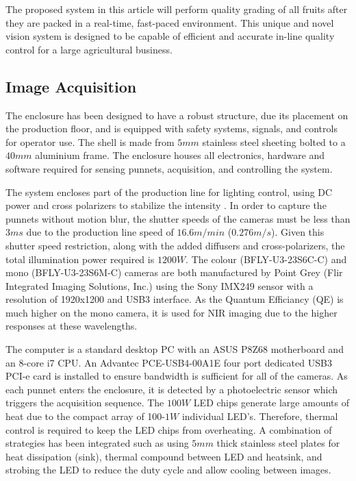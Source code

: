 \documentclass[fleqn,twoside]{article}
\begin{document}
The proposed system in this article will perform quality grading of all fruits after they are packed in a real-time, fast-paced environment. This unique and novel vision system is designed to be capable of efficient and accurate in-line quality control for a large agricultural business.   



\subsection{Image Acquisition}

The enclosure has been designed to have a robust structure, due its placement on the production floor, and is equipped with safety systems, signals, and controls for operator use. The shell is made from $5mm$ stainless steel sheeting bolted to a $40mm$ aluminium frame. The enclosure houses all electronics, hardware and software required for sensing punnets, acquisition, and controlling the system.

The system encloses part of the production line for lighting control, using DC power and cross polarizers to stabilize the intensity \cite{eaton}. In order to capture the punnets without motion blur, the shutter speeds of the cameras must be less than $3ms$ due to the production line speed of $16.6m/min$ ($0.276m/s$). Given this shutter speed restriction, along with the added diffusers and cross-polarizers, the total illumination power required is $1200W$. The colour (BFLY-U3-23S6C-C) and mono (BFLY-U3-23S6M-C) cameras are both manufactured by Point Grey (Flir Integrated Imaging Solutions, Inc.) using the Sony IMX249 sensor with a resolution of 1920x1200 and USB3 interface. As the Quantum Efficiancy (QE) is much higher on the mono camera, it is used for NIR imaging due to the higher responses at these wavelengths.

The computer is a standard desktop PC with an ASUS P8Z68 motherboard and an 8-core i7 CPU. An Advantec PCE-USB4-00A1E four port dedicated USB3 PCI-e card is installed to ensure bandwidth is sufficient for all of the cameras. As each punnet enters the enclosure, it is detected by a photoelectric sensor which triggers the acquisition sequence. The $100W$ LED chips generate large amounts of heat due to the compact array of 100-$1W$ individual LED's. Therefore, thermal control is required to keep the LED chips from overheating. A combination of strategies has been integrated such as using $5mm$ thick stainless steel plates for heat dissipation (sink), thermal compound between LED and heatsink, and strobing the LED to reduce the duty cycle and allow cooling between images.  
\end{document}
